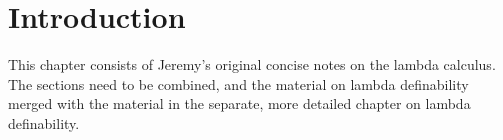 \documentclass[../../../include/open-logic-chapter]{subfiles}
\begin{document}
\chapter{Introduction}

\begin{editorial}
This chapter consists of Jeremy's original concise notes on the lambda
calculus. The sections need to be combined, and the material on lambda
definability merged with the material in the separate, more detailed
chapter on lambda definability.
\end{editorial}














\OLEndChapterHook
\end{document}
